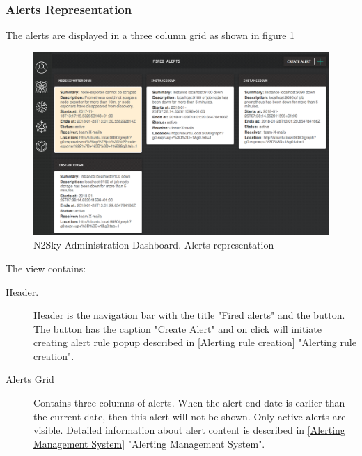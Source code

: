 \subsubsection{Alerts Representation}\label{Alerts representation}

The alerts are displayed in a three column grid as shown in figure \ref{fig:alert_representation}

\begin{figure}[H]
\begin{center}
  \includegraphics[width=\linewidth]{components/4/pics/alert_representation.png}
  \caption{N2Sky Administration Dashboard. Alerts representation}
  \label{fig:alert_representation}
\end{center}
\end{figure}

The view contains:

\begin{description}
\item[Header.] Header is the navigation bar with the title "Fired alerts" and the button. The button has the caption "Create Alert" and on click will initiate creating alert rule popup described in \autoref{Alerting rule creation} "Alerting rule creation".
\item[Alerts Grid] Contains three columns of alerts. When the alert end date is earlier than the current date, then this alert will not be shown. Only active alerts are visible. Detailed information about alert content is described in \autoref{Alerting Management System} "Alerting Management System".
\end{description}



